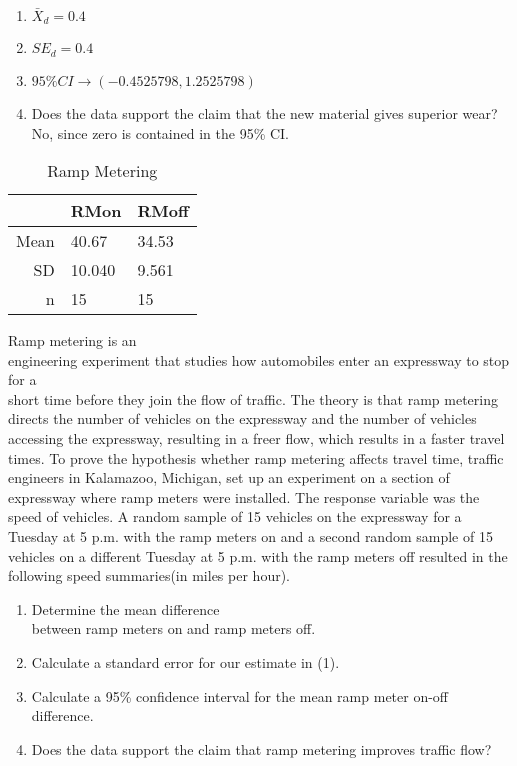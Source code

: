 \documentclass[11pt]{book}\usepackage[]{graphicx}\usepackage[]{color}
\begin{document}
\begin{exercises}
\begin{solution}
\begin{enumerate}
  \item $\bar{X}_d = 0.4 $     
  \item $SE_d = 0.4$
  \item $95\% CI  \rightarrow ( -0.4525798, 1.2525798 )$
  \item Does the data support the claim that the new material gives superior wear?  No, since zero is contained in the 95\% CI.
\end{enumerate}

\end{solution}

\begin{exercise}   %

\begin{table}[ht]
\centering
\begin{tabular}{rll}
  \hline
 & RMon & RMoff \\ 
  \hline
Mean & 40.67 & 34.53 \\ 
  SD & 10.040 & 9.561 \\ 
  n & 15 & 15 \\ 
   \hline
\end{tabular}
\caption{Ramp Metering} 
\end{table}


Ramp metering is an \\ engineering experiment that studies how automobiles enter an expressway to stop for a \\ short time before they join the flow of traffic.  The theory is that ramp metering  directs the number of vehicles on the expressway and the  number of vehicles accessing the expressway, resulting in a freer flow, which results in a faster travel times.  To prove the hypothesis whether ramp metering affects travel time, traffic engineers in Kalamazoo, Michigan, set up an experiment on a section of expressway where ramp meters were installed.  The response variable was the speed of vehicles.  A random sample of 15 vehicles on the expressway for a Tuesday at 5 p.m. with the ramp meters on and a second random sample of 15 vehicles on a different Tuesday at 5 p.m. with the ramp meters off resulted in the following speed summaries(in miles per hour).

\begin{enumerate}
  \item Determine the mean difference \\ between ramp meters on and ramp meters off.
  \item Calculate a standard error for our estimate in (1).
  \item Calculate a 95\% confidence interval for the mean ramp meter on-off difference.
  \item Does the data support the claim that ramp metering improves traffic flow?
\end{enumerate}



\end{exercise}
\end{exercises}
\end{document}
